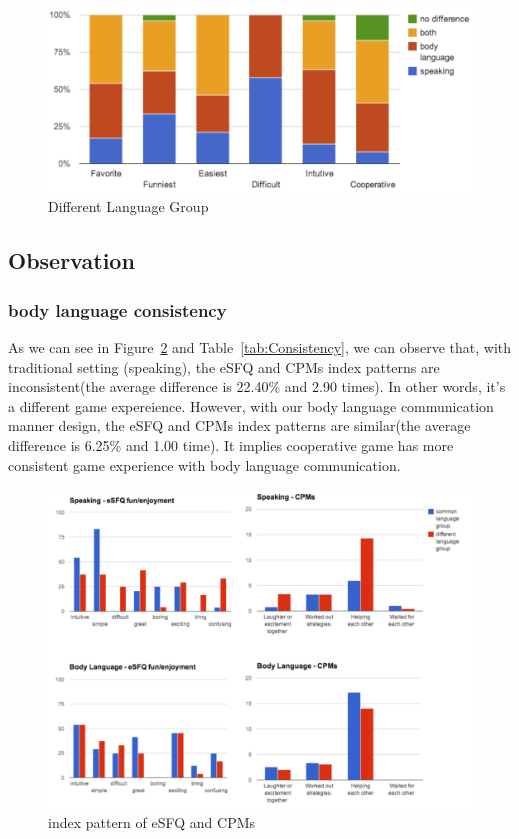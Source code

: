 \begin{figure}[!h]
\centering
\includegraphics[width=0.9\columnwidth]{Figures/US_FQ_Dif.png}
\caption{Different Language Group}
\label{fig:US_FQ_Dif}
\end{figure}



\subsection{Observation}

\subsubsection{body language consistency}
As we can see in Figure~\ref{fig:US_Consistent} and Table~\ref{tab:Consistency}, we can observe that, with traditional setting (speaking), the eSFQ and CPMs index patterns are inconsistent(the average difference is 22.40\% and 2.90 times). In other words, it's a different game expereience. However, with our body language communication manner design, the eSFQ and CPMs index patterns are similar(the average difference is 6.25\% and 1.00 time). It implies cooperative game has more consistent game experience with body language communication.

\begin{figure}[!h]
\centering
\includegraphics[width=1.1\columnwidth]{Figures/US_Consistent.png}
\caption{index pattern of eSFQ and CPMs}
\label{fig:US_Consistent}
\end{figure}

